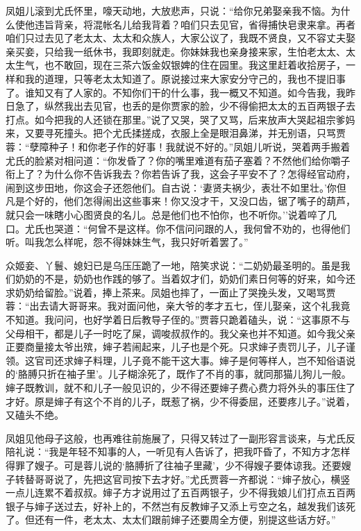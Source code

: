 凤姐儿滚到尤氏怀里，嚎天动地，大放悲声，只说：``给你兄弟娶亲我不恼。为什么使他违旨背亲，将混帐名儿给我背着？咱们只去见官，省得捕快皂隶来拿。再者咱们只过去见了老太太、太太和众族人，大家公议了，我既不贤良，又不容丈夫娶亲买妾，只给我一纸休书，我即刻就走。你妹妹我也亲身接来家，生怕老太太、太太生气，也不敢回，现在三茶六饭金奴银婢的住在园里。我这里赶着收拾房子，一样和我的道理，只等老太太知道了。原说接过来大家安分守己的，我也不提旧事了。谁知又有了人家的。不知你们干的什么事，我一概又不知道。如今告我，我昨日急了，纵然我出去见官，也丢的是你贾家的脸，少不得偷把太太的五百两银子去打点。如今把我的人还锁在那里。''说了又哭，哭了又骂，后来放声大哭起祖宗爹妈来，又要寻死撞头。把个尤氏揉搓成，衣服上全是眼泪鼻涕，并无别语，只骂贾蓉：``孽障种子！和你老子作的好事！我就说不好的。''凤姐儿听说，哭着两手搬着尤氏的脸紧对相问道：``你发昏了？你的嘴里难道有茄子塞着？不然他们给你嚼子衔上了？为什么你不告诉我去？你若告诉了我，这会子平安不了？怎得经官动府，闹到这步田地，你这会子还怨他们。自古说：`妻贤夫祸少，表壮不如里壮。'你但凡是个好的，他们怎得闹出这些事来！你又没才干，又没口齿，锯了嘴子的葫芦，就只会一味瞎小心图贤良的名儿。总是他们也不怕你，也不听你。''说着啐了几口。尤氏也哭道：``何曾不是这样。你不信问问跟的人，我何曾不劝的，也得他们听。叫我怎么样呢，怨不得妹妹生气，我只好听着罢了。''

众姬妾、丫鬟、媳妇已是乌压压跪了一地，陪笑求说：``二奶奶最圣明的。虽是我们奶奶的不是，奶奶也作践的够了。当着奴才们，奶奶们素日何等的好来，如今还求奶奶给留脸。''说着，捧上茶来。凤姐也摔了，一面止了哭挽头发，又喝骂贾蓉：``出去请大哥哥来。我对面问他，亲大爷的孝才五七，侄儿娶亲，这个礼我竟不知道。我问问，也好学着日后教导子侄的。''贾蓉只跪着磕头，说：``这事原不与父母相干，都是儿子一时吃了屎，调唆叔叔作的。我父亲也并不知道。如今我父亲正要商量接太爷出殡，婶子若闹起来，儿子也是个死。只求婶子责罚儿子，儿子谨领。这官司还求婶子料理，儿子竟不能干这大事。婶子是何等样人，岂不知俗语说的`胳膊只折在袖子里'。儿子糊涂死了，既作了不肖的事，就同那猫儿狗儿一般。婶子既教训，就不和儿子一般见识的，少不得还要婶子费心费力将外头的事压住了才好。原是婶子有这个不肖的儿子，既惹了祸，少不得委屈，还要疼儿子。''说着，又磕头不绝。

凤姐见他母子这般，也再难往前施展了，只得又转过了一副形容言谈来，与尤氏反陪礼说：``我是年轻不知事的人，一听见有人告诉了，把我吓昏了，不知方才怎样得罪了嫂子。可是蓉儿说的`胳膊折了往袖子里藏'，少不得嫂子要体谅我。还要嫂子转替哥哥说了，先把这官司按下去才好。''尤氏贾蓉一齐都说：``婶子放心，横竖一点儿连累不着叔叔。婶子方才说用过了五百两银子，少不得我娘儿们打点五百两银子与婶子送过去，好补上的，不然岂有反教婶子又添上亏空之名，越发我们该死了。但还有一件，老太太、太太们跟前婶子还要周全方便，别提这些话方好。''


